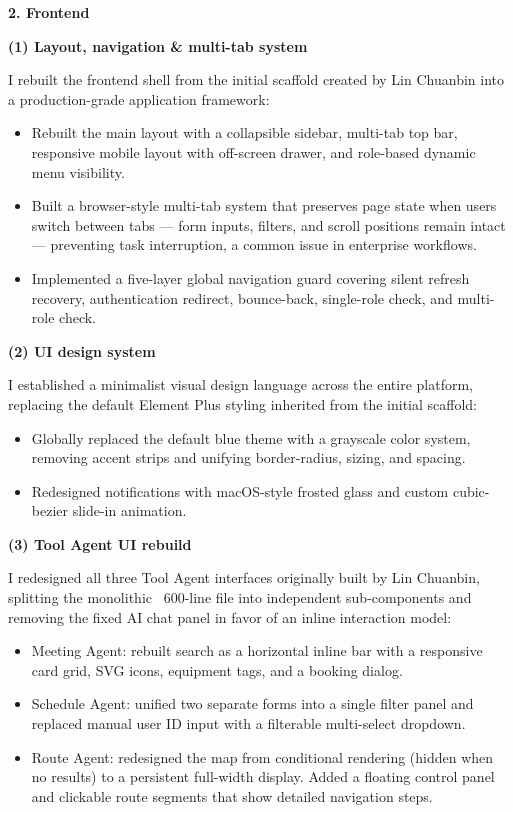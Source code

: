 \textbf{2. Frontend}

\textbf{(1) Layout, navigation \& multi-tab system}

I rebuilt the frontend shell from the initial scaffold created by Lin Chuanbin into a production-grade application framework:

\begin{itemize}
  \item Rebuilt the main layout with a collapsible sidebar, multi-tab top bar, responsive mobile layout with off-screen drawer, and role-based dynamic menu visibility.
  \item Built a browser-style multi-tab system that preserves page state when users switch between tabs --- form inputs, filters, and scroll positions remain intact --- preventing task interruption, a common issue in enterprise workflows.
  \item Implemented a five-layer global navigation guard covering silent refresh recovery, authentication redirect, bounce-back, single-role check, and multi-role check.
\end{itemize}

\textbf{(2) UI design system}

I established a minimalist visual design language across the entire platform, replacing the default Element Plus styling inherited from the initial scaffold:

\begin{itemize}
  \item Globally replaced the default blue theme with a grayscale color system, removing accent strips and unifying border-radius, sizing, and spacing.
  \item Redesigned notifications with macOS-style frosted glass and custom cubic-bezier slide-in animation.
\end{itemize}

\textbf{(3) Tool Agent UI rebuild}

I redesigned all three Tool Agent interfaces originally built by Lin Chuanbin, splitting the monolithic ~600-line file into independent sub-components and removing the fixed AI chat panel in favor of an inline interaction model:

\begin{itemize}
  \item Meeting Agent: rebuilt search as a horizontal inline bar with a responsive card grid, SVG icons, equipment tags, and a booking dialog.
  \item Schedule Agent: unified two separate forms into a single filter panel and replaced manual user ID input with a filterable multi-select dropdown.
  \item Route Agent: redesigned the map from conditional rendering (hidden when no results) to a persistent full-width display. Added a floating control panel and clickable route segments that show detailed navigation steps.
\end{itemize}


